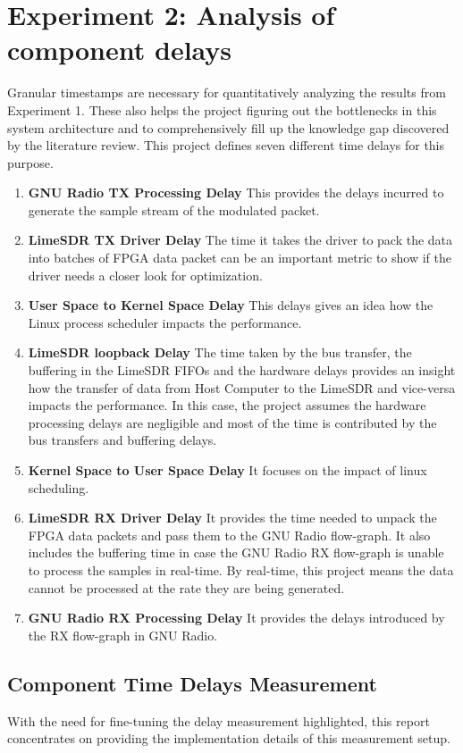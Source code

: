 \section{Experiment 2: Analysis of component delays}
Granular timestamps are necessary for quantitatively analyzing the results from Experiment 1.
These also helps the project figuring out the bottlenecks in this system architecture and to comprehensively fill up the knowledge gap discovered by the literature review.
This project defines seven different time delays for this purpose.
\begin{enumerate}
    \item {\textbf{GNU Radio TX Processing Delay} This provides the delays incurred to generate the sample stream of the modulated packet.}
    \item{\textbf{LimeSDR TX Driver Delay} The time it takes the driver to pack the data into batches of FPGA data packet can be an important metric to show if the driver needs a closer look for optimization. } 
    \item{\textbf{User Space to Kernel Space Delay} This delays gives an idea how the Linux process scheduler impacts the performance.
    }
    \item{\textbf{LimeSDR loopback Delay} The time taken by the bus transfer, the buffering in the LimeSDR FIFOs  and the hardware delays provides an insight how the transfer of  data from Host Computer to the LimeSDR and vice-versa impacts the performance.
    In this case, the project assumes the hardware processing delays are negligible and most of the time is contributed by the bus transfers and buffering delays.
    }
    \item{\textbf{Kernel Space to User Space Delay} It focuses on the impact of linux scheduling.
    }
    \item{\textbf{LimeSDR RX Driver Delay} It provides the time needed to unpack the FPGA data packets and pass them to the GNU Radio flow-graph.
    It also includes the buffering time in case the GNU Radio RX flow-graph is unable to process the samples in real-time.
    By real-time, this project means the data cannot be processed at the rate they are being generated.}
    \item{\textbf{GNU Radio RX Processing Delay} It provides the delays introduced by the RX flow-graph in GNU Radio.}
    
\end{enumerate}

\subsection{Component Time Delays Measurement}
 With the need for fine-tuning the delay measurement highlighted, this report concentrates on providing the implementation details of this measurement setup.\\
 
